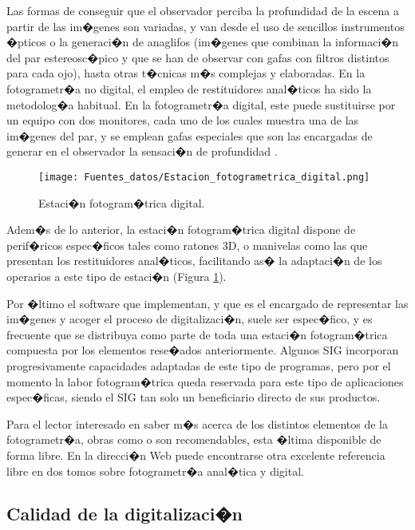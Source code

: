 Las formas de conseguir que el observador perciba la profundidad de la escena a partir de las im�genes son variadas, y van desde el uso de sencillos instrumentos �pticos o la generaci�n de anaglifos (im�genes que combinan la informaci�n del par estereosc�pico y que se han de observar con gafas con filtros distintos para cada ojo), hasta otras t�cnicas m�s complejas y elaboradas. En la fotogrametr�a no digital, el empleo de restituidores anal�ticos %
ha sido la metodolog�a habitual. En la fotogrametr�a digital, este puede sustituirse por un equipo con dos monitores, cada uno de los cuales muestra una de las im�genes del par, y se emplean gafas especiales que son las encargadas de generar en el observador la sensaci�n de profundidad .

\begin{figure}
\centering
\texttt{[image: Fuentes\_datos/Estacion\_fotogrametrica\_digital.png]}
\caption{\small Estaci�n fotogram�trica digital.}
\label{Fig:Estacion_fotogrametrica_digital} 
\end{figure}

Adem�s de lo anterior, la estaci�n fotogram�trica digital dispone de perif�ricos espec�ficos tales como ratones 3D, o manivelas como las que presentan los restituidores anal�ticos, facilitando as� la adaptaci�n de los operarios a este tipo de estaci�n (Figura \ref{Fig:Estacion_fotogrametrica_digital}).

Por �ltimo el software que implementan, y que es el encargado de representar las im�genes y acoger el proceso de digitalizaci�n, suele ser espec�fico, y es frecuente que se distribuya como parte de toda una estaci�n fotogram�trica compuesta por los elementos rese�ados anteriormente. Algunos SIG incorporan progresivamente capacidades adaptadas de este tipo de programas, pero por el momento la labor fotogram�trica queda reservada para este tipo de aplicaciones espec�ficas, siendo el SIG tan solo un beneficiario directo de sus productos.

Para el lector interesado en saber m�s acerca de los distintos elementos de la fotogrametr�a, obras como  \cite{Lerma2002UPV} o \cite{Brito2002IME} son recomendables, esta �ltima disponible de forma libre. En la direcci�n Web \cite{webFotogrametriaUNEX} puede encontrarse otra excelente referencia libre en dos tomos sobre fotogrametr�a anal�tica y digital.

\subsection{Calidad de la digitalizaci�n}
\label{Condiciones_digitalizacion}

